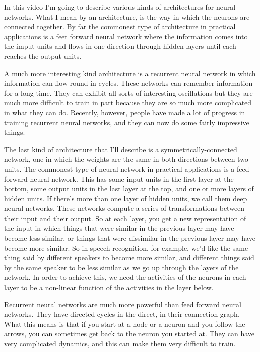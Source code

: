 \begin{multicols}{2}
\begin{footnotesize}
In this video I'm going to describe various kinds of architectures for neural networks. What I mean by an architecture, is the way in which the neurons are connected together. By far the commonest type of architecture in practical applications is a feet forward neural network where the information comes into the imput units and flows in one direction through hidden layers until each reaches the output units.

A much more interesting kind architecture is a recurrent neural network in which information can flow round in cycles. These networks can remember information for a long time. They can exhibit all sorts of interesting oscillations but they are much more difficult to train in part because they are so much more complicated in what they can do. Recently, however, people have made a lot of progress in training recurrent neural networks, and they can now do some fairly impressive things.

The last kind of architecture that I'll describe is a symmetrically-connected network, one in which the weights are the same in both directions between two units. The commonest type of neural network in practical applications is a feed-forward neural network. This has some input units in the first layer at the bottom, some output units in the last layer at the top, and one or more layers of hidden units. If there's more than one layer of hidden units, we call them deep neural networks. These networks compute a series of transformations between their input and their output. So at each layer, you get a new representation of the input in which things that were similar in the previous layer may have become less similar, or things that were dissimilar in the previous layer may have become more similar. So in speech recognition, for example, we'd like the same thing said by different speakers to become more similar, and different things said by the same speaker to be less similar as we go up through the layers of the network. In order to achieve this, we need the activities of the neurons in each layer to be a non-linear function of the activities in the layer below. 

Recurrent neural networks are much more powerful than feed forward neural networks. They have directed cycles in the direct, in their connection graph. What this means is that if you start at a node or a neuron and you follow the arrows, you can sometimes get back to the neuron you started at. They can have very complicated dynamics, and this can make them very difficult to train. 


\end{footnotesize}
\end{multicols}
